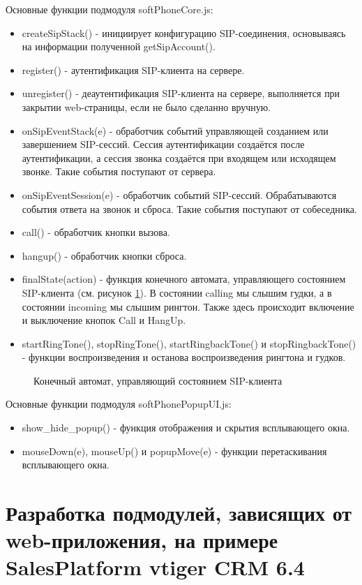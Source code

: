 Основные функции подмодуля softPhoneCore.js:
\begin{itemize}
\item createSipStack() - инициирует конфигурацию SIP-соединения, основываясь на информации полученной getSipAccount().
\item register() - аутентификация SIP-клиента на сервере.
\item unregister() - деаутентификация SIP-клиента на сервере, выполняется при закрытии web-страницы, если не было сделанно вручную.
\item onSipEventStack(e) - обработчик событий управляющей созданием или завершением SIP-сессий. Сессия аутентификации создаётся после аутентификации, а сессия звонка создаётся при входящем или исходящем звонке. Такие события поступают от сервера.
\item onSipEventSession(e) - обработчик событий SIP-сессий. Обрабатываются события ответа на звонок и сброса. Такие события поступают от собеседника.
\item call() - обработчик кнопки вызова.
\item hangup() - обработчик кнопки сброса.
\item finalState(action) - функция конечного автомата, управляющего состоянием SIP-клиента (см. рисунок \ref{image:FinalState}). В состоянии calling мы слышим гудки, а в состоянии incoming мы слышим рингтон. Также здесь происходит включение и выключение кнопок Call и HangUp.
\item startRingTone(), stopRingTone(), startRingbackTone() и stopRingbackTone() - функции воспроизведения и останова воспроизведения рингтона и гудков.
\end{itemize}

\begin{figure}[h!]
\caption{Конечный автомат, управляющий состоянием SIP-клиента}
\label{image:FinalState}
\end{figure}

Основные функции подмодуля softPhonePopupUI.js:
\begin{itemize}
\item show\_hide\_popup() - функция отображения и скрытия всплывающего окна.
\item mouseDown(e), mouseUp() и popupMove(e) - функции перетаскивания всплывающего окна.
\end{itemize}

\section{Разработка подмодулей, зависящих от web-приложения, на примере SalesPlatform vtiger CRM 6.4}

